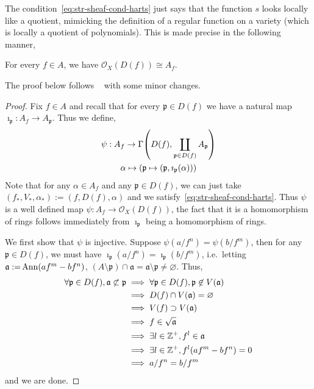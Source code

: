 \documentclass[000-main.tex]{subfiles}
\begin{document}
The condition~\eqref{eq:str-sheaf-cond-harts} just says that the function $s$ looks locally like a quotient, mimicking the definition of a regular function on a variety (which is locally a quotient of polynomials).
This is made precise in the following manner,
\begin{proposition}
  For every $f\in A$, we have $\mathcal{O}_X(D(f)) \cong A_f$.
\end{proposition}
The proof below follows \citeauthor{hartshorneAlgebraicGeometry1977}~\cite[][71-72]{hartshorneAlgebraicGeometry1977} with some minor changes.
\begin{proof}\TOPROVE
  Fix $f\in A$ and recall that for every $\mathfrak{p}\in D(f)$ we have a natural map $\imath_{\mathfrak{p}}: A_f \to A_\mathfrak{p}$.
  Thus we define,
  \begin{displaymath}
    \begin{gathered}
      \psi: A_f \to \Gamma\qty(D(f), \coprod_{\mathfrak{p}\in D(f)}A_\mathfrak{p})\\
      \alpha \mapsto (\mathfrak{p}\mapsto (\mathfrak{p}, \imath_{\mathfrak{p}}(\alpha)))
    \end{gathered}
  \end{displaymath}
  Note that for any $\alpha\in A_f$ and any $\mathfrak{p}\in D(f)$, we can just take $(f_\ast, V_\ast, \alpha_\ast) := (f, D(f), \alpha)$ and we satisfy~\eqref{eq:str-sheaf-cond-harts}.
  Thus $\psi$ is a well defined map $\psi: A_f \to \mathcal{O}_X(D(f))$, the fact that it is a homomorphism of rings follows immediately from $\imath_{\mathfrak{p}}$ being a homomorphism of rings.

  We first show that $\psi$ is injective.
  Suppose $\psi(a/f^n) = \psi(b/f^m)$, then for any $\mathfrak{p}\in D(f)$, we must have $\imath_\mathfrak{p}(a/f^n) = \imath_\mathfrak{p}(b/f^m)$, i.e.\ letting $\mathfrak{a := }\operatorname{Ann}(af^m - bf^n)$, $(A\setminus \mathfrak{p})\cap \mathfrak{a} = \mathfrak{a}\setminus\mathfrak{p}\neq\varnothing$.
  Thus,
  \begin{align*}
    \forall\mathfrak{p}\in D(f), \mathfrak{a} \not\subset \mathfrak{p}
    &\implies \forall \mathfrak{p}\in D(f), \mathfrak{p}\not\in V(\mathfrak{a})\\
    &\implies D(f)\cap V(\mathfrak{a}) = \varnothing\\
    &\implies V(f) \supset V(\mathfrak{a})\\
    &\implies f \in \sqrt{\mathfrak{a}}\\
    &\implies \exists l\in\mathbb{Z}^+, f^l\in \mathfrak{a}\\
    &\implies \exists l\in\mathbb{Z}^+, f^l(af^m - bf^n) = 0\\
    &\implies a/f^n = b/f^m
  \end{align*}
  and we are done.


\end{proof}
\end{document}

